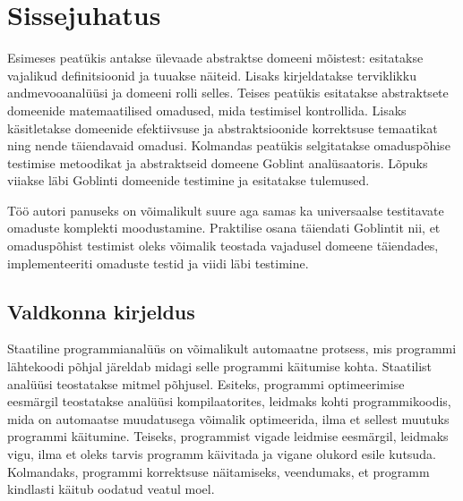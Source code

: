 \documentclass[../thesis.tex]{subfiles}
\begin{document}
\section*{Sissejuhatus}


Esimeses peatükis antakse ülevaade abstraktse domeeni mõistest: esitatakse vajalikud definitsioonid ja tuuakse näiteid. Lisaks kirjeldatakse terviklikku andmevooanalüüsi ja domeeni rolli selles.
Teises peatükis esitatakse abstraktsete domeenide matemaatilised omadused, mida testimisel kontrollida. Lisaks käsitletakse domeenide efektiivsuse ja abstraktsioonide korrektsuse temaatikat ning nende täiendavaid omadusi.
Kolmandas peatükis selgitatakse omaduspõhise testimise metoodikat ja abstraktseid domeene Goblint analüsaatoris. Lõpuks viiakse läbi Goblinti domeenide testimine ja esitatakse tulemused.

Töö autori panuseks on võimalikult suure aga samas ka universaalse testitavate omaduste komplekti moodustamine. Praktilise osana täiendati Goblintit nii, et omaduspõhist testimist oleks võimalik teostada vajadusel domeene täiendades, implementeeriti omaduste testid ja viidi läbi testimine.

\subsection*{Valdkonna kirjeldus}


Staatiline programmianalüüs on võimalikult automaatne protsess, mis programmi lähtekoodi põhjal järeldab midagi selle programmi käitumise kohta. Staatilist analüüsi teostatakse mitmel põhjusel. Esiteks, programmi optimeerimise eesmärgil teostatakse analüüsi kompilaatorites, leidmaks kohti programmikoodis, mida on automaatse muudatusega võimalik optimeerida, ilma et sellest muutuks programmi käitumine. Teiseks, programmist vigade leidmise eesmärgil, leidmaks vigu, ilma et oleks tarvis programm käivitada ja vigane olukord esile kutsuda. Kolmandaks, programmi korrektsuse näitamiseks, veendumaks, et programm kindlasti käitub oodatud veatul moel.
\end{document}
